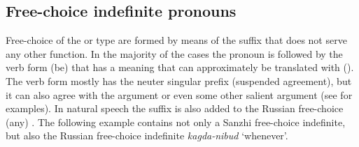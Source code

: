 
\subsection{Free-choice indefinite pronouns}
\label{ssec:Free-choice indefinite pronouns}

Free-choice  of the  or  type are formed by means of the suffix  that does not serve any other function. In the majority of the cases the pronoun is followed by the verb form  (be) that has a  meaning that can approximately be translated with  (). The verb form  mostly has the neuter singular prefix  (suspended agreement), but it can also agree with the  argument or even some other salient argument (see  for examples). In natural speech the suffix  is also added to the Russian free-choice   (any) . The following example  contains not only a Sanzhi free-choice indefinite, but also the Russian free-choice indefinite \textit{kagda-nibud} `whenever'.
%
